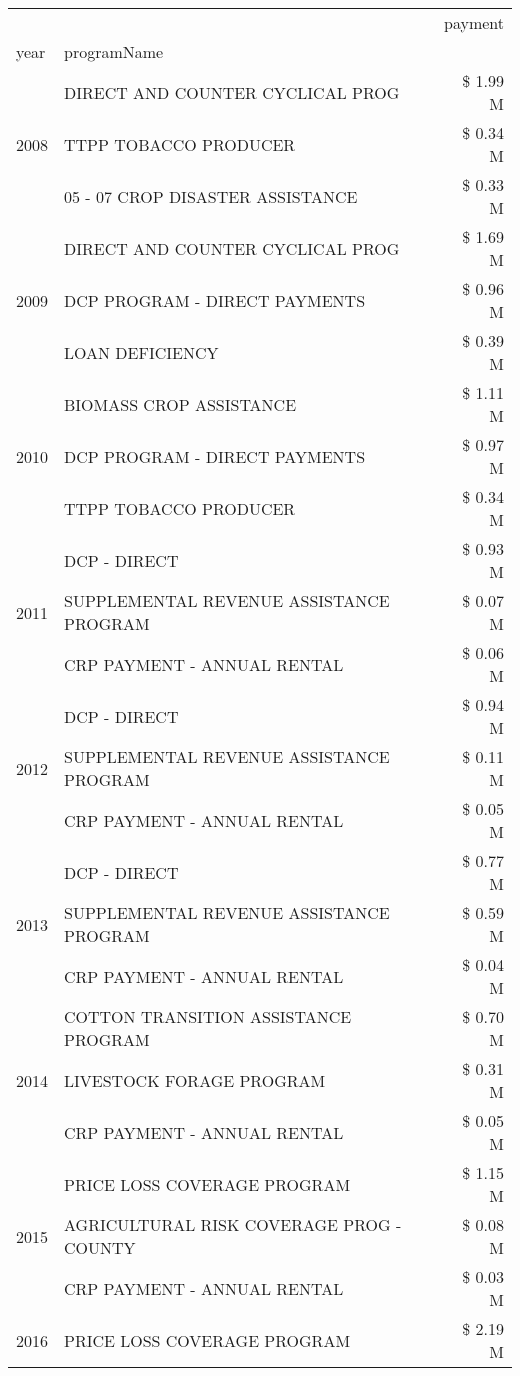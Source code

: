 \begin{tabular}{llr}
\toprule
 &  & payment \\
year & programName &  \\
\midrule
\multirow[t]{3}{*}{2008} & DIRECT AND COUNTER CYCLICAL PROG & \$ 1.99 M \\
 & TTPP TOBACCO PRODUCER & \$ 0.34 M \\
 & 05 - 07 CROP DISASTER ASSISTANCE & \$ 0.33 M \\
\cline{1-3}
\multirow[t]{3}{*}{2009} & DIRECT AND COUNTER CYCLICAL PROG & \$ 1.69 M \\
 & DCP PROGRAM - DIRECT PAYMENTS & \$ 0.96 M \\
 & LOAN DEFICIENCY & \$ 0.39 M \\
\cline{1-3}
\multirow[t]{3}{*}{2010} & BIOMASS CROP ASSISTANCE & \$ 1.11 M \\
 & DCP PROGRAM - DIRECT PAYMENTS & \$ 0.97 M \\
 & TTPP TOBACCO PRODUCER & \$ 0.34 M \\
\cline{1-3}
\multirow[t]{3}{*}{2011} & DCP - DIRECT & \$ 0.93 M \\
 & SUPPLEMENTAL REVENUE ASSISTANCE PROGRAM & \$ 0.07 M \\
 & CRP PAYMENT - ANNUAL RENTAL & \$ 0.06 M \\
\cline{1-3}
\multirow[t]{3}{*}{2012} & DCP - DIRECT & \$ 0.94 M \\
 & SUPPLEMENTAL REVENUE ASSISTANCE PROGRAM & \$ 0.11 M \\
 & CRP PAYMENT - ANNUAL RENTAL & \$ 0.05 M \\
\cline{1-3}
\multirow[t]{3}{*}{2013} & DCP - DIRECT & \$ 0.77 M \\
 & SUPPLEMENTAL REVENUE ASSISTANCE PROGRAM & \$ 0.59 M \\
 & CRP PAYMENT - ANNUAL RENTAL & \$ 0.04 M \\
\cline{1-3}
\multirow[t]{3}{*}{2014} & COTTON TRANSITION ASSISTANCE PROGRAM & \$ 0.70 M \\
 & LIVESTOCK FORAGE PROGRAM & \$ 0.31 M \\
 & CRP PAYMENT - ANNUAL RENTAL & \$ 0.05 M \\
\cline{1-3}
\multirow[t]{3}{*}{2015} & PRICE LOSS COVERAGE PROGRAM & \$ 1.15 M \\
 & AGRICULTURAL RISK COVERAGE PROG - COUNTY & \$ 0.08 M \\
 & CRP PAYMENT - ANNUAL RENTAL & \$ 0.03 M \\
\cline{1-3}
\multirow[t]{3}{*}{2016} & PRICE LOSS COVERAGE PROGRAM                   & \$ 2.19 M \\

\end{tabular}
